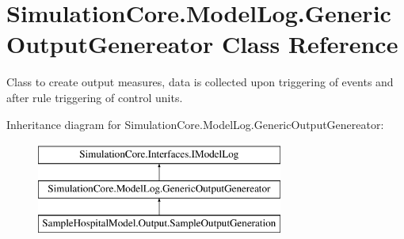 \hypertarget{class_simulation_core_1_1_model_log_1_1_generic_output_genereator}{}\section{Simulation\+Core.\+Model\+Log.\+Generic\+Output\+Genereator Class Reference}
\label{class_simulation_core_1_1_model_log_1_1_generic_output_genereator}


Class to create output measures, data is collected upon triggering of events and after rule triggering of control units.  


Inheritance diagram for Simulation\+Core.\+Model\+Log.\+Generic\+Output\+Genereator\+:\begin{figure}[H]
\begin{center}
\leavevmode
\includegraphics[height=3.000000cm]{class_simulation_core_1_1_model_log_1_1_generic_output_genereator}
\end{center}
\end{figure}
